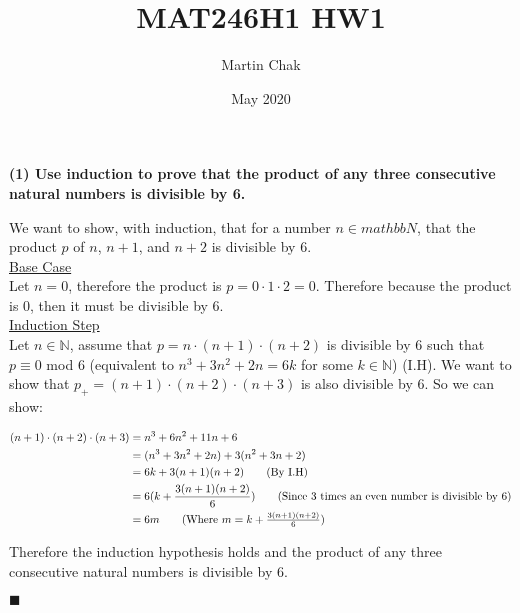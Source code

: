 \documentclass[20pt]{article}
\title{MAT246H1 HW1}
\author{Martin Chak}
\date{May 2020}
\begin{document}
\noindent
\textbf{(1) Use induction to prove that the product of any three consecutive natural numbers is divisible by 6.}
\begin{text}
    We want to show, with induction, that for a number $n \in mathbb{N}$, that the product $p$ of $n$, $n + 1$, and $n + 2$ is divisible by 6.\\
    
    \noindent
    \underline{Base Case}\\
    Let $n = 0$, therefore the product is $p = 0 \cdot 1 \cdot 2 = 0$. Therefore because the product is 0, then it must be divisible by 6.\\
    
    \noindent
    \underline{Induction Step}\\
    Let $n \in \mathbb{N}$, assume that $p = n \cdot (n + 1) \cdot (n + 2)$ is divisible by 6 such that $p \equiv 0$ mod $6$ (equivalent to $n^3 + 3n^2+ 2n = 6k$ for some $k \in \mathbb{N}$) (I.H). We want to show that $p_+ = (n + 1) \cdot (n + 2) \cdot (n + 3)$ is also divisible by 6. So we can show:
    
    \begin{align}
        (n+1) \cdot (n+2) \cdot (n+3) &= n^3 + 6n^2 + 11n + 6\nonumber\\
        &=(n^3 + 3n^2 + 2n) + 3(n^2 + 3n + 2)\nonumber\\
        &= 6k + 3(n + 1)(n + 2)\nonumber\tag{By I.H}\\
        &= 6(k + \frac{3(n + 1)(n + 2)}{6})\tag{Since 3 times an even number is divisible by 6}\\
        &= 6m\tag{Where $m = k + \frac{3(n + 1)(n + 2)}{6}$}\nonumber
    \end{align}
    
    \noindent
    Therefore the induction hypothesis holds and the product of any three consecutive natural numbers is divisible by 6.
    
    \hfill $\blacksquare$
\end{text}\\
\end{document}

